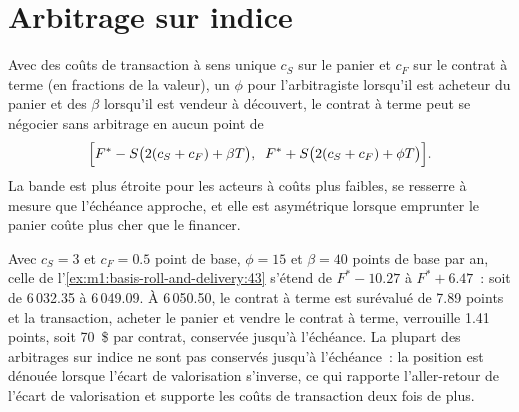 \section{Arbitrage sur indice}

\begin{proposition}\label{prop:m1:basis-roll-and-delivery:band}
Avec des coûts de transaction à sens unique $c_S$ sur le panier et $c_F$ sur le contrat à terme (en
fractions de la valeur), un  $\phi$ pour l'arbitragiste lorsqu'il est
acheteur du panier et des  $\beta$ lorsqu'il est vendeur à découvert, le contrat à terme peut se négocier
sans arbitrage en aucun point de
\[
\Bigl[F^* - S\bigl(2(c_S + c_F) + \beta T\bigr),\;\; F^* + S\bigl(2(c_S + c_F) + \phi T\bigr)\Bigr].
\]
La bande est plus étroite pour les acteurs à coûts plus faibles, se resserre à mesure que l'échéance
approche, et elle est asymétrique lorsque emprunter le panier coûte plus cher que
le financer.
\end{proposition}

\begin{example}\label{ex:m1:basis-roll-and-delivery:band}
Avec $c_S = 3$ et $c_F = 0.5$ point de base, $\phi = 15$ et $\beta = 40$ points de
base par an, celle de l'\cref{ex:m1:basis-roll-and-delivery:43} s'étend de
$F^* - 10.27$ à $F^* + 6.47$~: soit de 6\,032.35 à 6\,049.09. À 6\,050.50, le
contrat à terme est surévalué de 7.89 points et la transaction, acheter le panier et vendre le contrat à terme,
verrouille 1.41 points, soit 70~\$ par contrat, conservée jusqu'à l'échéance. La plupart des arbitrages sur indice
ne sont pas conservés jusqu'à l'échéance~: la position est dénouée lorsque l'écart de valorisation s'inverse,
ce qui rapporte l'aller-retour de l'écart de valorisation et supporte les coûts de transaction deux
fois de plus.
\end{example}

